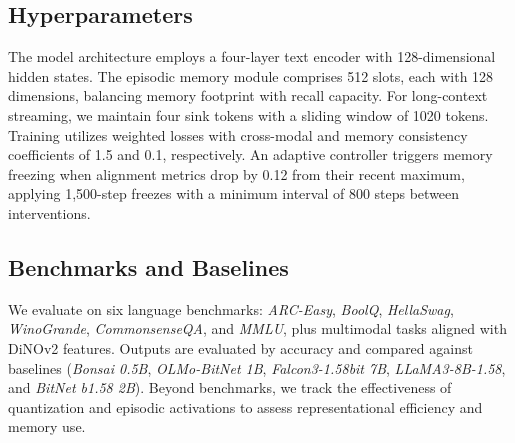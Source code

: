 \subsection{Hyperparameters}
The model architecture employs a four-layer text encoder with 128-dimensional hidden states. The episodic memory module comprises 512 slots, each with 128 dimensions, balancing memory footprint with recall capacity. For long-context streaming, we maintain four sink tokens with a sliding window of 1020 tokens. Training utilizes weighted losses with cross-modal and memory consistency coefficients of 1.5 and 0.1, respectively. An adaptive controller triggers memory freezing when alignment metrics drop by 0.12 from their recent maximum, applying 1,500-step freezes with a minimum interval of 800 steps between interventions.


 


\subsection{Benchmarks and Baselines}
We evaluate on six language benchmarks: \textit{ARC-Easy}, \textit{BoolQ}, \textit{HellaSwag}, \textit{WinoGrande}, \textit{CommonsenseQA}, and \textit{MMLU}, plus multimodal tasks aligned with DiNOv2 features. Outputs are evaluated by accuracy and compared against baselines (\textit{Bonsai 0.5B}, \textit{OLMo-BitNet 1B}, \textit{Falcon3-1.58bit 7B}, \textit{LLaMA3-8B-1.58}, and \textit{BitNet b1.58 2B}). Beyond benchmarks, we track the effectiveness of quantization and episodic activations to assess representational efficiency and memory use.



